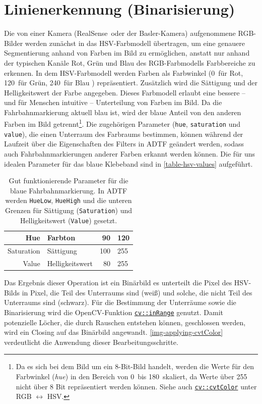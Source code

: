 \documentclass[a4paper,12pt]{report}
\begin{document}
\section{Linienerkennung (Binarisierung)}
	Die von einer Kamera (RealSense\texttrademark\ oder der Basler-Kamera) aufgenommene RGB-Bilder werden zunächst in das HSV-Farbmodell übertragen, um eine genauere Segmentierung anhand von Farben im Bild zu ermöglichen, anstatt nur anhand der typischen Kanäle Rot, Grün und Blau des RGB-Farbmodells Farbbereiche zu erkennen.
	In dem HSV-Farbmodell werden Farben als Farbwinkel (0\degree\ für Rot, 120\degree\ für Grün, 240\degree\ für Blau \cite{HSV-Wiki}) repräsentiert. Zusätzlich wird die Sättigung und der Helligkeitswert der Farbe angegeben.
	Dieses Farbmodell erlaubt eine bessere -- und für Menschen intuitive -- Unterteilung von Farben im Bild.
	Da die Fahrbahnmarkierung aktuell blau ist, wird der blaue Anteil von den anderen Farben im Bild getrennt\footnote{Da es sich bei dem Bild um ein 8-Bit-Bild handelt, werden die Werte für den Farbwinkel (\textit{hue}) in den Bereich von 0\degree\ bis 180\degree\ skaliert, da Werte über 255 nicht über 8 Bit repräsentiert werden können.
	Siehe auch \href{https://docs.opencv.org/2.4/modules/imgproc/doc/miscellaneous_transformations.html\#cvtcolor}{\texttt{cv::cvtColor}} \cite{opencv-doc} unter RGB $\longleftrightarrow$ HSV.}.
	Die zugehörigen Parameter (\texttt{hue}, \texttt{saturation} und \texttt{value}), die einen Unterraum des Farbraums bestimmen, können während der Laufzeit über die Eigenschaften des Filters in ADTF geändert werden, sodass auch Fahrbahnmarkierungen anderer Farben erkannt werden können.
	Die für uns idealen Parameter für das blaue Klebeband sind in \autoref{table-hsv-values} aufgeführt.

	\begin{table}
		\centering
		\begin{tabular}{r@{\,/\,}l|r@{$-$}l}
			Hue & Farbton & 90 & 120\\\hline
			Saturation & Sättigung & 100 & 255\\\hline
			Value & Helligkeitswert & 80 & 255
		\end{tabular}
		\caption{Gut funktionierende Parameter für die blaue Fahrbahnmarkierung. In ADTF werden \texttt{HueLow}, \texttt{HueHigh} und die unteren Grenzen für Sättigung (\texttt{Saturation}) und Helligkeitswert (\texttt{Value}) gesetzt.}
		\label{table-hsv-values}
	\end{table}

	Das Ergebnis dieser Operation ist ein Binärbild es unterteilt die Pixel des HSV-Bilds in Pixel, die Teil des Unterraums sind (weiß) und solche, die nicht Teil des Unterraums sind (schwarz).
	Für die Bestimmung der Unterräume sowie die Binarisierung wird die OpenCV-Funktion \href{https://docs.opencv.org/3.4.0/d2/de8/group\_\_core\_\_array.html\#ga48af0ab51e36436c5d04340e036ce981}{\texttt{cv::inRange}} \cite{opencv-doc} genutzt.
	Damit potenzielle Löcher, die durch Rauschen entstehen können, geschlossen werden, wird ein Closing auf das Binärbild angewandt.
	\autoref{img-applying-cvtColor} verdeutlicht die Anwendung dieser Bearbeitungsschritte.
\end{document}
